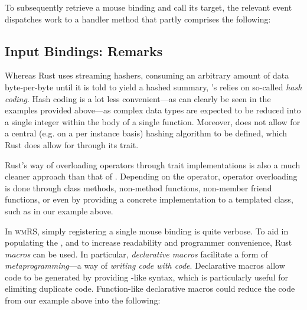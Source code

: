 To subsequently retrieve a mouse binding and call its target, the relevant
 event dispatches work to a handler method that partly
comprises the following:

\begin{cppblock}
  void
  Model::handle_mouse(MouseEvent& event)
  {
    MouseBindings& mb = this->mouse_bindings;
\end{cppblock}
\begin{cppblock}
    if (mb.find(event.input) != mb.end())
      mb.at(event.input)(*this, event.window);
  }
\end{cppblock}


\subsection{Input Bindings: Remarks}

Whereas Rust uses streaming hashers, consuming an arbitrary amount of
data byte-per-byte until it is told to yield a hashed summary, \cpp{}'s
 relies on so-called \textit{hash
coding}\cite{buildingahashmap}. Hash coding is a lot less convenient---as
can clearly be seen in the examples provided above---as complex data types
are expected to be reduced into a single integer within the body of a single
function\cite{buildingahashmap}. Moreover, \cpp does not allow for a central
(e.g. on a per  instance basis) hashing algorithm to be defined,
which Rust does allow for through its  trait\cite{therustbook,
therustreference}.

Rust's way of overloading operators through trait implementations is also
a much cleaner approach than that of \cpp. Depending on the operator, \cpp
operator overloading is done through class methods, non-method functions,
non-member friend functions, or even by providing a concrete implementation to
a templated class, such as in our 
example above\cite{cppstd}.


In \textsc{wmRS}, simply registering a single mouse binding is quite verbose.
To aid in populating the , and to increase readability and
programmer convenience, Rust \textit{macros} can be used. In particular,
\textit{declarative macros} facilitate a form of \textit{metaprogramming}---a
way of \textit{writing code with code}\cite{therustbook, therustreference,
rustmacros}. Declarative macros allow code to be generated by providing
-like syntax, which is particularly useful for elimiting duplicate
code. Function-like declarative macros could reduce the code from our example
above into the following:

